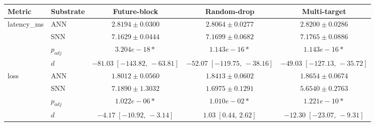 \begin{tabular}{l l c c c }
\toprule
Metric & Substrate & Future-block & Random-drop & Multi-target \\
\midrule
latency_ms & ANN & $2.8194 \pm 0.0300$ & $2.8064 \pm 0.0277$ & $2.8200 \pm 0.0286$ \\
 & SNN & $7.1629 \pm 0.0444$ & $7.1699 \pm 0.0682$ & $7.1765 \pm 0.0886$ \\
 & $p_{adj}$ & $3.204e-18*$ & $1.143e-16*$ & $1.143e-16*$ \\
 & $d$ & $-81.03\;[-143.82,\,-63.81]$ & $-52.07\;[-119.75,\,-38.16]$ & $-49.03\;[-127.13,\,-35.72]$ \\
\midrule
loss & ANN & $1.8012 \pm 0.0560$ & $1.8413 \pm 0.0602$ & $1.8654 \pm 0.0674$ \\
 & SNN & $7.1890 \pm 1.3032$ & $1.6975 \pm 0.1291$ & $5.6540 \pm 0.2763$ \\
 & $p_{adj}$ & $1.022e-06*$ & $1.010e-02*$ & $1.221e-10*$ \\
 & $d$ & $-4.17\;[-10.92,\,-3.14]$ & $1.03\;[0.44,\,2.62]$ & $-12.30\;[-23.07,\,-9.31]$ \\
\midrule
\bottomrule
\end{tabular}